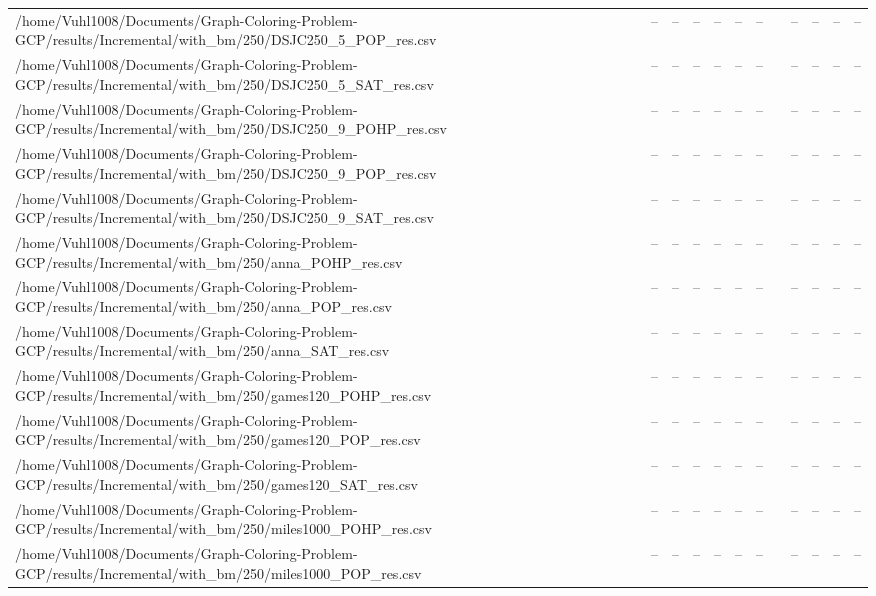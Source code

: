 \begin{table}[htbp]
\begin{tabular}{llllllllllll}
/home/Vuhl1008/Documents/Graph-Coloring-Problem-GCP/results/Incremental/with\_bm/250/DSJC250\_5\_POP\_res.csv & -- & -- & -- & -- & -- & -- & {} & -- & -- & -- & -- \\
/home/Vuhl1008/Documents/Graph-Coloring-Problem-GCP/results/Incremental/with\_bm/250/DSJC250\_5\_SAT\_res.csv & -- & -- & -- & -- & -- & -- & {} & -- & -- & -- & -- \\
/home/Vuhl1008/Documents/Graph-Coloring-Problem-GCP/results/Incremental/with\_bm/250/DSJC250\_9\_POHP\_res.csv & -- & -- & -- & -- & -- & -- & {} & -- & -- & -- & -- \\
/home/Vuhl1008/Documents/Graph-Coloring-Problem-GCP/results/Incremental/with\_bm/250/DSJC250\_9\_POP\_res.csv & -- & -- & -- & -- & -- & -- & {} & -- & -- & -- & -- \\
/home/Vuhl1008/Documents/Graph-Coloring-Problem-GCP/results/Incremental/with\_bm/250/DSJC250\_9\_SAT\_res.csv & -- & -- & -- & -- & -- & -- & {} & -- & -- & -- & -- \\
/home/Vuhl1008/Documents/Graph-Coloring-Problem-GCP/results/Incremental/with\_bm/250/anna\_POHP\_res.csv & -- & -- & -- & -- & -- & -- & {} & -- & -- & -- & -- \\
/home/Vuhl1008/Documents/Graph-Coloring-Problem-GCP/results/Incremental/with\_bm/250/anna\_POP\_res.csv & -- & -- & -- & -- & -- & -- & {} & -- & -- & -- & -- \\
/home/Vuhl1008/Documents/Graph-Coloring-Problem-GCP/results/Incremental/with\_bm/250/anna\_SAT\_res.csv & -- & -- & -- & -- & -- & -- & {} & -- & -- & -- & -- \\
/home/Vuhl1008/Documents/Graph-Coloring-Problem-GCP/results/Incremental/with\_bm/250/games120\_POHP\_res.csv & -- & -- & -- & -- & -- & -- & {} & -- & -- & -- & -- \\
/home/Vuhl1008/Documents/Graph-Coloring-Problem-GCP/results/Incremental/with\_bm/250/games120\_POP\_res.csv & -- & -- & -- & -- & -- & -- & {} & -- & -- & -- & -- \\
/home/Vuhl1008/Documents/Graph-Coloring-Problem-GCP/results/Incremental/with\_bm/250/games120\_SAT\_res.csv & -- & -- & -- & -- & -- & -- & {} & -- & -- & -- & -- \\
/home/Vuhl1008/Documents/Graph-Coloring-Problem-GCP/results/Incremental/with\_bm/250/miles1000\_POHP\_res.csv & -- & -- & -- & -- & -- & -- & {} & -- & -- & -- & -- \\
/home/Vuhl1008/Documents/Graph-Coloring-Problem-GCP/results/Incremental/with\_bm/250/miles1000\_POP\_res.csv & -- & -- & -- & -- & -- & -- & {} & -- & -- & -- & -- \\

\end{tabular}
\end{table}

